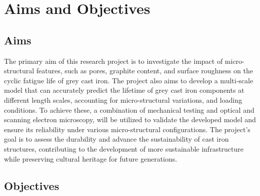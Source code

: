 \documentclass[11pt,a4paper]{article}
\begin{document}
\section{Aims and Objectives}
\label{sec:objectives}

\subsection{Aims}

The primary aim of this research project is to investigate the impact of micro-structural features, such as pores, graphite content, and surface roughness on the cyclic fatigue life of grey cast iron. The project also aims to develop a multi-scale model that can accurately predict the lifetime of grey cast iron components at different length scales, accounting for micro-structural variations, and loading conditions. To achieve these, a combination of mechanical testing and optical and scanning electron microscopy, will be utilized to validate the developed model and ensure its reliability under various micro-structural configurations. The project's goal is to assess the durability and advance the sustainability of cast iron structures, contributing to the development of more sustainable infrastructure while preserving cultural heritage for future generations.

\subsection{Objectives}
\end{document}
